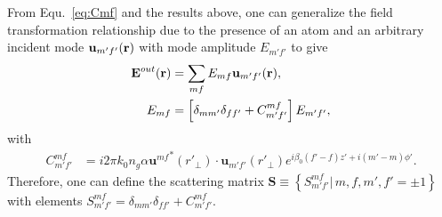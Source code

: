 \documentclass[preprint,aps,pra,onecolumn]{revtex4-1} %
\begin{document}
From Equ.~\eqref{eq:Cmf} and the results above, one can generalize the field transformation relationship due to the presence of an atom and an arbitrary incident mode $\mathbf{u}_{m'f'}(\mathbf{r})$ with mode amplitude $E_{m'f'}$ to give
\begin{align}
\mathbf{E}^{out}(\mathbf{r}) &= \sum_{mf}E_{mf}\mathbf{u}_{m'f'}(\mathbf{r}),\\
E_{mf} &= \left[\delta_{mm'}\delta_{ff'}+C_{m'f'}^{mf}\right]E_{m'f'},
\end{align}
with 
\begin{align}
C^{mf}_{m'f'}
&= i2\pi k_0 n_g\alpha  {\mathbf{u}^{mf}}^*(r'_{\!\perp})\cdot \mathbf{u}_{m'f'}(r'_{\!\perp})e^{i\beta_0 
(f'-f)z'+i(m'-m)\phi'}.\label{eq:Cmfmf}
\end{align}
Therefore, one can define the scattering matrix $\mathbf{S}\equiv \left\{S^{mf}_{m'f'}|\,m,f,m',f'=\pm 1 \right\}$ with elements $S^{mf}_{m'f'}=\delta_{mm'}\delta_{ff'}+C_{m'f'}^{mf}$. 
\end{document}
